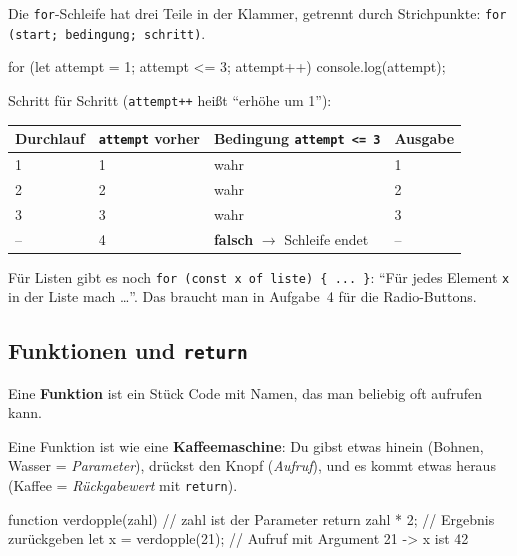 \documentclass[a4paper,11pt]{article}
\begin{document}
Die \texttt{for}-Schleife hat drei Teile in der Klammer, getrennt durch Strichpunkte:
\lstinline|for (start; bedingung; schritt)|.

\begin{code}
for (let attempt = 1; attempt <= 3; attempt++) {
    console.log(attempt);
}
\end{code}

Schritt für Schritt (\lstinline|attempt++| heißt "`erhöhe um 1"'):
\begin{center}
\begin{tabular}{@{}llll@{}}
\toprule
Durchlauf & \texttt{attempt} vorher & Bedingung \texttt{attempt <= 3} & Ausgabe\\
\midrule
1 & 1 & wahr & 1\\
2 & 2 & wahr & 2\\
3 & 3 & wahr & 3\\
-- & 4 & \textbf{falsch} $\to$ Schleife endet & --\\
\bottomrule
\end{tabular}
\end{center}

Für Listen gibt es noch \lstinline|for (const x of liste) { ... }|: "`Für jedes Element \texttt{x} in der Liste
mach \dots"'. Das braucht man in Aufgabe~4 für die Radio-Buttons.

\subsection{Funktionen und \texttt{return}}

Eine \textbf{Funktion} ist ein Stück Code mit Namen, das man beliebig oft aufrufen kann.

\begin{analogie}
Eine Funktion ist wie eine \textbf{Kaffeemaschine}: Du gibst etwas hinein (Bohnen, Wasser = \emph{Parameter}),
drückst den Knopf (\emph{Aufruf}), und es kommt etwas heraus (Kaffee = \emph{Rückgabewert} mit \texttt{return}).
\end{analogie}

\begin{code}
function verdopple(zahl) {    // zahl ist der Parameter
    return zahl * 2;          // Ergebnis zurückgeben
}
let x = verdopple(21);        // Aufruf mit Argument 21 -> x ist 42
\end{code}
\end{document}
